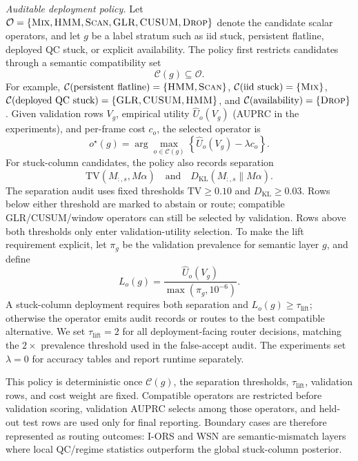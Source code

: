 \documentclass[conference]{IEEEtran}
\newcommand{\TV}{\mathrm{TV}}
\begin{document}
\noindent\emph{Auditable deployment policy.}
Let \(\mathcal{O}=\{\textsc{Mix},\textsc{HMM},\textsc{Scan},\textsc{GLR},\textsc{CUSUM},\textsc{Drop}\}\) denote the candidate scalar operators, and let \(g\) be a label stratum such as iid stuck, persistent flatline, deployed QC stuck, or explicit availability. The policy first restricts candidates through a semantic compatibility set
\[
\mathcal{C}(g)\subseteq\mathcal{O}.
\]
For example, \(\mathcal{C}(\text{persistent flatline})=\{\textsc{HMM},\textsc{Scan}\}\), \(\mathcal{C}(\text{iid stuck})=\{\textsc{Mix}\}\), \(\mathcal{C}(\text{deployed QC stuck})=\{\textsc{GLR},\textsc{CUSUM},\textsc{HMM}\}\), and \(\mathcal{C}(\text{availability})=\{\textsc{Drop}\}\). Given validation rows \(V_g\), empirical utility \(\widehat U_o(V_g)\) (AUPRC in the experiments), and per-frame cost \(c_o\), the selected operator is
\[
o^\star(g)=
\arg\max_{o\in\mathcal{C}(g)}
\left\{\widehat U_o(V_g)-\lambda c_o\right\}.
\]
For stuck-column candidates, the policy also records separation
\[
\TV(M_{:,s},M\alpha)
\quad\text{and}\quad
D_{\mathrm{KL}}(M_{:,s}\|M\alpha).
\]
The separation audit uses fixed thresholds \(\TV\ge0.10\) and \(D_{\mathrm{KL}}\ge0.03\). Rows below either threshold are marked to abstain or route; compatible GLR/CUSUM/window operators can still be selected by validation. Rows above both thresholds only enter validation-utility selection. To make the lift requirement explicit, let \(\pi_g\) be the validation prevalence for semantic layer \(g\), and define
\[
L_o(g)=\frac{\widehat U_o(V_g)}{\max(\pi_g,10^{-6})}.
\]
A stuck-column deployment requires both separation and \(L_o(g)\ge\tau_{\mathrm{lift}}\); otherwise the operator emits audit records or routes to the best compatible alternative. We set \(\tau_{\mathrm{lift}}=2\) for all deployment-facing router decisions, matching the \(2\times\) prevalence threshold used in the false-accept audit. The experiments set \(\lambda=0\) for accuracy tables and report runtime separately.

This policy is deterministic once \(\mathcal{C}(g)\), the separation thresholds, \(\tau_{\mathrm{lift}}\), validation rows, and cost weight are fixed. Compatible operators are restricted before validation scoring, validation AUPRC selects among those operators, and held-out test rows are used only for final reporting. Boundary cases are therefore represented as routing outcomes: I-ORS and WSN are semantic-mismatch layers where local QC/regime statistics outperform the global stuck-column posterior.
\end{document}
